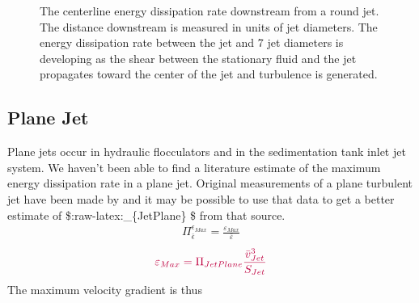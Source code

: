 \documentclass[letterpaper,10pt,english]{sphinxmanual}
\let\sphinxpxdimen\pdfpxdimen\else\newdimen\sphinxpxdimen
\begin{document}
\begin{figure}[htbp]
\centering
\capstart

\noindent\sphinxincludegraphics[width=400\sphinxpxdimen]{{Jet_centerline_EDR}.png}
\caption{The centerline energy dissipation rate downstream from a round jet. The distance downstream is measured in units of jet diameters. The energy dissipation rate between the jet and 7 jet diameters is developing as the shear between the stationary fluid and the jet propagates toward the center of the jet and turbulence is generated.}\label{\detokenize{Rapid_Mix/RM_Derivations:id7}}\label{\detokenize{Rapid_Mix/RM_Derivations:figure-jet-centerline-edr}}\end{figure}


\subsection{Plane Jet}
\label{\detokenize{Rapid_Mix/RM_Derivations:plane-jet}}\label{\detokenize{Rapid_Mix/RM_Derivations:heading-plane-jet}}
Plane jets occur in hydraulic flocculators and in the sedimentation tank inlet jet system. We haven’t been able to find a literature estimate of the maximum energy dissipation rate in a plane jet. Original measurements of a plane turbulent jet have been made by  and it may be possible to use that data to get a better estimate of \$:raw-latex:\_\{JetPlane\} \$ from that source.
\begin{equation}\label{equation:Rapid_Mix/RM_Derivations:Rapid_Mix/RM_Derivations:92}
\begin{split}\Pi_{\bar \epsilon}^{\epsilon_{Max}} = \frac{\varepsilon_{Max}}{\bar \varepsilon}\end{split}
\end{equation}\begin{equation}\label{equation:Rapid_Mix/RM_Derivations:Rapid_Mix/RM_Derivations:93}
\begin{split}\color{purple}{
  \varepsilon_{Max} = \Pi_{JetPlane}  \frac{  \bar v_{Jet} ^3}{S_{Jet}}
  }\end{split}
\end{equation}
The maximum velocity gradient is thus
\end{document}
